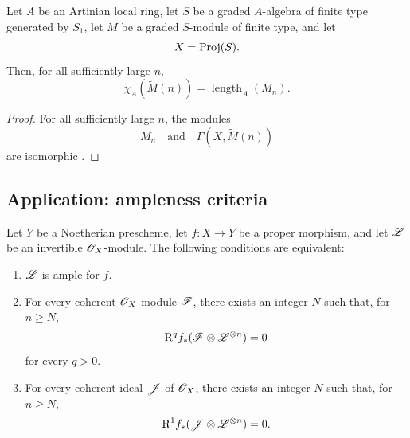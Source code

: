 \begin{corollary}[2.5.4]
\label{III.2.5.4}
Let $A$ be an Artinian local ring, let $S$ be a graded $A$-algebra of finite type generated by $S_1$, let $M$ be a graded $S$-module of finite type, and let
\[
  X=\operatorname{Proj}(S).
\]
Then, for all sufficiently large $n$,
\[
  \chi_A(\widetilde{M}(n))
  =
  \operatorname{length}_A(M_n).
\]
\end{corollary}

\begin{proof}
For all sufficiently large $n$, the modules
\[
  M_n
  \quad\text{and}\quad
  \Gamma(X,\widetilde{M}(n))
\]
are isomorphic .
\end{proof}


\subsection{Application: ampleness criteria}
\label{subsection:III.2.6}

\begin{proposition}[2.6.1]
\label{III.2.6.1}
Let $Y$ be a Noetherian prescheme, let $f:X\to Y$ be a proper morphism,
and let $\mathscr{L}$ be an invertible $\mathscr{O}_X$-module.
The following conditions are equivalent:
\begin{enumerate}
  \item[\emph{a)}] $\mathscr{L}$ is ample for $f$.
  \item[\emph{b)}] For every coherent $\mathscr{O}_X$-module $\mathscr{F}$, there
  exists an integer $N$ such that, for $n\geq N$,
  \[
    \mathrm{R}^qf_*(\mathscr{F}\otimes\mathscr{L}^{\otimes n})=0
  \]
  for every $q>0$.
  \item[\emph{c)}] For every coherent ideal $\mathscr{J}$ of $\mathscr{O}_X$, there
  exists an integer $N$ such that, for $n\geq N$,
  \[
    \mathrm{R}^1f_*(\mathscr{J}\otimes\mathscr{L}^{\otimes n})=0.
  \]
\end{enumerate}
\end{proposition}

